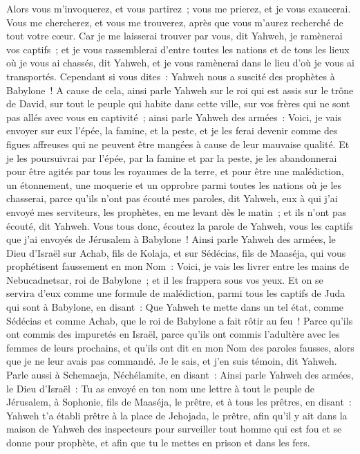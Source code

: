 \begin{multicols}{2}
Alors vous m'invoquerez, et vous partirez~; vous me prierez, et je vous exaucerai.
Vous me chercherez, et vous me trouverez, après que vous m'aurez recherché de tout votre cœur.
Car je me laisserai trouver par vous, dit Yahweh, je ramènerai vos captifs~; et je vous rassemblerai d'entre toutes les nations et de tous les lieux où je vous ai chassés, dit Yahweh, et je vous ramènerai dans le lieu d'où je vous ai transportés.
Cependant si vous dites~: Yahweh nous a suscité des prophètes à Babylone~!
 A cause de cela, ainsi parle Yahweh sur le roi qui est assis sur le trône de David, sur tout le peuple qui habite dans cette ville, sur vos frères qui ne sont pas allés avec vous en captivité~;
ainsi parle Yahweh des armées~: Voici, je vais envoyer sur eux l'épée, la famine, et la peste, et je les ferai devenir comme des figues affreuses qui ne peuvent être mangées à cause de leur mauvaise qualité.
Et je les poursuivrai par l'épée, par la famine et par la peste, je les abandonnerai pour être agités par tous les royaumes de la terre, et pour être une malédiction, un étonnement, une moquerie et un opprobre parmi toutes les nations où je les chasserai,
parce qu'ils n'ont pas écouté mes paroles, dit Yahweh, eux à qui j'ai envoyé mes serviteurs, les prophètes, en me levant dès le matin~; et ils n'ont pas écouté, dit Yahweh.
Vous tous donc, écoutez la parole de Yahweh, vous les captifs que j'ai envoyés de Jérusalem à Babylone~!
Ainsi parle Yahweh des armées, le Dieu d'Israël sur Achab, fils de Kolaja, et sur Sédécias, fils de Maaséja, qui vous prophétisent faussement en mon Nom~: Voici, je vais les livrer entre les mains de Nebucadnetsar, roi de Babylone~; et il les frappera sous vos yeux.
Et on se servira d'eux comme une formule de malédiction, parmi tous les captifs de Juda qui sont à Babylone, en disant~: Que Yahweh te mette dans un tel état, comme Sédécias et comme Achab, que le roi de Babylone a fait rôtir au feu~!
Parce qu'ils ont commis des impuretés en Israël, parce qu'ils ont commis l'adultère avec les femmes de leurs prochains, et qu'ils ont dit en mon Nom des paroles fausses, alors que je ne leur avais pas commandé. Je le sais, et j'en suis témoin, dit Yahweh.
Parle aussi à Schemaeja, Néchélamite, en disant~:
Ainsi parle Yahweh des armées, le Dieu d'Israël~: Tu as envoyé en ton nom une lettre à tout le peuple de Jérusalem, à Sophonie, fils de Maaséja, le prêtre, et à tous les prêtres, en disant~:
Yahweh t'a établi prêtre à la place de Jehojada, le prêtre, afin qu'il y ait dans la maison de Yahweh des inspecteurs pour surveiller tout homme qui est fou et se donne pour prophète, et afin que tu le mettes en prison et dans les fers.

\end{multicols}
